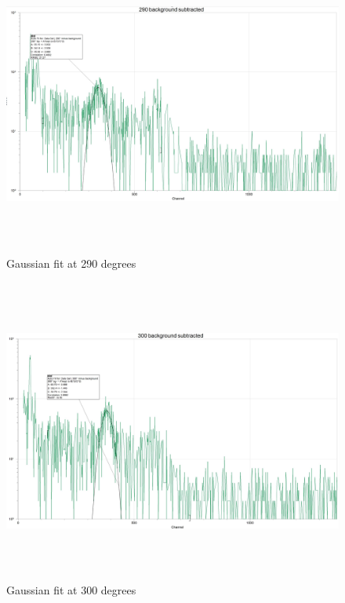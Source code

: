 \documentclass[fleqn]{article}
\begin{document}
  \begin{figure}[htbp]
    \includegraphics[height=10cm, width=18cm]{Six.JPG}
    \caption{
      Gaussian fit at 290 degrees
    }
  \end{figure}

  \pagebreak

  \begin{figure}[htbp]
    \includegraphics[height=10cm, width=18cm]{Seven.JPG}
    \caption{
      Gaussian fit at 300 degrees
    }
  \end{figure}

  \pagebreak
\end{document}
